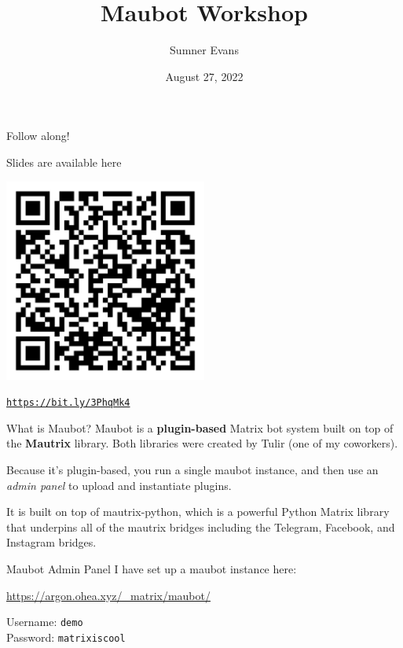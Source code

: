 \documentclass{acm}
\title{Maubot Workshop}
\author{Sumner Evans}
\institute{Beeper}
\date{August 27, 2022}
\begin{document}
\begin{frame}{Follow along!}
    \begin{center}
    Slides are available here
        \vspace{0.5cm}
    \end{center}

    \centerline{\includegraphics[width=0.5\textwidth]{images/slides-qrcode}}

    \begin{center}
        \href{https://bit.ly/3PhqMk4}{\texttt{https://bit.ly/3PhqMk4}}
    \end{center}
\end{frame}

\begin{frame}{What is Maubot?}
    Maubot is a \textbf{plugin-based} Matrix bot system built on top of the
    \textbf{Mautrix} library. Both libraries were created by Tulir (one of my
    coworkers).

    \pause
    Because it's plugin-based, you run a single maubot instance, and then use an
    \textit{admin panel} to upload and instantiate plugins.

    \pause
    It is built on top of mautrix-python, which is a powerful Python Matrix
    library that underpins all of the mautrix bridges including the Telegram,
    Facebook, and Instagram bridges.
\end{frame}

\begin{frame}{Maubot Admin Panel}
    I have set up a maubot instance here:

    \begin{center}
        \Large
        \url{https://argon.ohea.xyz/_matrix/maubot/}
    \end{center}

    Username: \texttt{demo} \\
    Password: \texttt{matrixiscool}
\end{frame}
\end{document}
